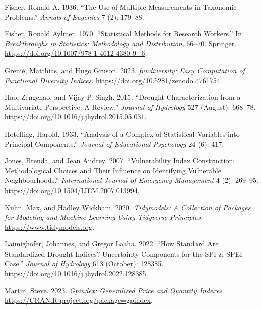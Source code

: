 \documentclass[
]{interact}
\newlength{\cslhangindent}
\newlength{\cslentryspacingunit} %
\newenvironment{CSLReferences}[2] %
 {%
  \setlength{\parindent}{0pt}
  \ifodd #1
  \let\oldpar\par
  \def\par{\hangindent=\cslhangindent\oldpar}
  \fi
  \setlength{\parskip}{#2\cslentryspacingunit}
 }%
 {}
\begin{document}
\begin{CSLReferences}{1}{0}
\leavevmode{}%
Fisher, Ronald A. 1936. {``The Use of Multiple Measurements in Taxonomic
Problems.''} \emph{Annals of Eugenics} 7 (2): 179--88.

\leavevmode{}%
Fisher, Ronald Aylmer. 1970. {``Statistical Methods for Research
Workers.''} In \emph{Breakthroughs in Statistics: Methodology and
Distribution}, 66--70. Springer.
\url{https://doi.org/10.1007/978-1-4612-4380-9_6}.

\leavevmode{}%
Grenié, Matthias, and Hugo Gruson. 2023. \emph{{fundiversity}: Easy
Computation of Functional Diversity Indices}.
\url{https://doi.org/10.5281/zenodo.4761754}.

\leavevmode{}%
Hao, Zengchao, and Vijay P. Singh. 2015. {``Drought Characterization
from a Multivariate Perspective: {A} Review.''} \emph{Journal of
Hydrology} 527 (August): 668--78.
\url{https://doi.org/10.1016/j.jhydrol.2015.05.031}.

\leavevmode{}%
Hotelling, Harold. 1933. {``Analysis of a Complex of Statistical
Variables into Principal Components.''} \emph{Journal of Educational
Psychology} 24 (6): 417.

\leavevmode{}%
Jones, Brenda, and Jean Andrey. 2007. {``Vulnerability Index
Construction: Methodological Choices and Their Influence on Identifying
Vulnerable Neighbourhoods.''} \emph{International Journal of Emergency
Management} 4 (2): 269--95.
\url{https://doi.org/10.1504/IJEM.2007.013994}.

\leavevmode{}%
Kuhn, Max, and Hadley Wickham. 2020. \emph{Tidymodels: A Collection of
Packages for Modeling and Machine Learning Using Tidyverse Principles.}
\url{https://www.tidymodels.org}.

\leavevmode{}%
Laimighofer, Johannes, and Gregor Laaha. 2022. {``How Standard Are
Standardized Drought Indices? {Uncertainty} Components for the {SPI} \&
{SPEI} Case.''} \emph{Journal of Hydrology} 613 (October): 128385.
\url{https://doi.org/10.1016/j.jhydrol.2022.128385}.

\leavevmode{}%
Martin, Steve. 2023. \emph{Gpindex: Generalized Price and Quantity
Indexes}. \url{https://CRAN.R-project.org/package=gpindex}.


\end{CSLReferences}
\end{document}
